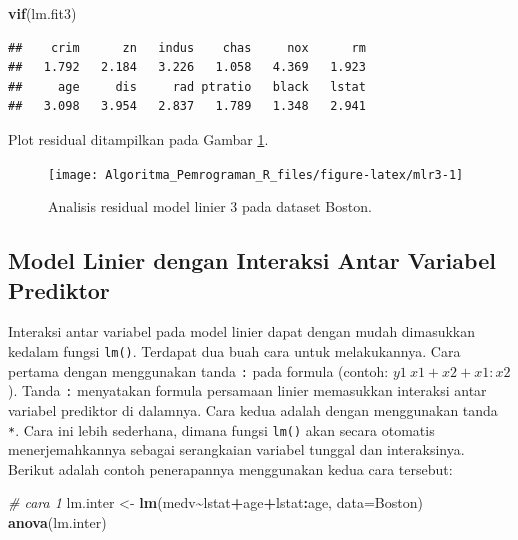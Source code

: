 \documentclass[
]{book}
\newenvironment{Shaded}{\begin{snugshade}}{\end{snugshade}}
\newcommand{\AttributeTok}[1]{\textcolor[rgb]{0.13,0.29,0.53}{#1}}
\newcommand{\CommentTok}[1]{\textcolor[rgb]{0.56,0.35,0.01}{\textit{#1}}}
\newcommand{\FunctionTok}[1]{\textcolor[rgb]{0.13,0.29,0.53}{\textbf{#1}}}
\newcommand{\NormalTok}[1]{#1}
\newcommand{\OtherTok}[1]{\textcolor[rgb]{0.56,0.35,0.01}{#1}}
\newcommand{\SpecialCharTok}[1]{\textcolor[rgb]{0.81,0.36,0.00}{\textbf{#1}}}
\theoremstyle{definition}
\theoremstyle{definition}
\theoremstyle{definition}
\theoremstyle{definition}
\theoremstyle{remark}
\begin{document}
\begin{Shaded}
\begin{Highlighting}[]
\FunctionTok{vif}\NormalTok{(lm.fit3)}
\end{Highlighting}
\end{Shaded}

\begin{verbatim}
##    crim      zn   indus    chas     nox      rm 
##   1.792   2.184   3.226   1.058   4.369   1.923 
##     age     dis     rad ptratio   black   lstat 
##   3.098   3.954   2.837   1.789   1.348   2.941
\end{verbatim}

Plot residual ditampilkan pada Gambar \ref{fig:mlr3}.

\begin{figure}

{\centering \texttt{[image: Algoritma\_Pemrograman\_R\_files/figure-latex/mlr3-1]} 

}

\caption{Analisis residual model linier 3 pada dataset Boston.}\label{fig:mlr3}
\end{figure}

\hypertarget{lminter}{%
\subsection{Model Linier dengan Interaksi Antar Variabel Prediktor}\label{lminter}}

Interaksi antar variabel pada model linier dapat dengan mudah dimasukkan kedalam fungsi \texttt{lm()}. Terdapat dua buah cara untuk melakukannya. Cara pertama dengan menggunakan tanda \texttt{:} pada formula (contoh: \(y1 ~ x1+x2+x1:x2\)). Tanda \texttt{:} menyatakan formula persamaan linier memasukkan interaksi antar variabel prediktor di dalamnya. Cara kedua adalah dengan menggunakan tanda \texttt{*}. Cara ini lebih sederhana, dimana fungsi \texttt{lm()} akan secara otomatis menerjemahkannya sebagai serangkaian variabel tunggal dan interaksinya. Berikut adalah contoh penerapannya menggunakan kedua cara tersebut:

\begin{Shaded}
\begin{Highlighting}[]
\CommentTok{\# cara 1}
\NormalTok{lm.inter }\OtherTok{\textless{}{-}} \FunctionTok{lm}\NormalTok{(medv}\SpecialCharTok{\textasciitilde{}}\NormalTok{lstat}\SpecialCharTok{+}\NormalTok{age}\SpecialCharTok{+}\NormalTok{lstat}\SpecialCharTok{:}\NormalTok{age, }\AttributeTok{data=}\NormalTok{Boston)}
\FunctionTok{anova}\NormalTok{(lm.inter)}
\end{Highlighting}
\end{Shaded}
\end{document}
